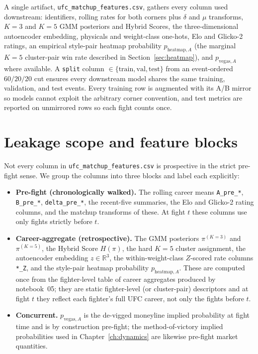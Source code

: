 \documentclass[12pt,oneside]{report}
\begin{document}
A single artifact, \texttt{ufc\_matchup\_features.csv}, gathers every
column used downstream: identifiers, rolling rates for both corners
plus $\delta$ and $\mu$ transforms, \(K = 3\) and \(K = 5\) GMM
posteriors and Hybrid Scores, the three-dimensional autoencoder
embedding, physicals and weight-class one-hots, Elo and Glicko-2
ratings, an empirical style-pair heatmap probability
\(p_{\mathrm{heatmap},A}\) (the marginal \(K = 5\) cluster-pair win rate
described in Section~\ref{sec:heatmap}), and \(p_{\mathrm{vegas},A}\)
where available.  A \texttt{split} column $\in \{\text{train},
\text{val}, \text{test}\}$ from an event-ordered $60/20/20$ cut
ensures every downstream model shares the same training, validation,
and test events.  Every training row is augmented with its A/B
mirror so models cannot exploit the arbitrary corner convention, and
test metrics are reported on unmirrored rows so each fight counts
once.

\section{Leakage scope and feature blocks}\label{sec:leakage-scope}

Not every column in \texttt{ufc\_matchup\_features.csv} is
prospective in the strict pre-fight sense.  We group the columns
into three blocks and label each explicitly:

\begin{itemize}
\item \textbf{Pre-fight (chronologically walked).}  The rolling
career means \texttt{A\_pre\_*}, \texttt{B\_pre\_*},
\texttt{delta\_pre\_*}, the recent-five summaries, the Elo and
Glicko-2 rating columns, and the matchup transforms of these.  At
fight $t$ these columns use only fights strictly before $t$.

\item \textbf{Career-aggregate (retrospective).}  The GMM posteriors
\(\pi^{(K = 3)}\) and \(\pi^{(K = 5)}\), the Hybrid Score \(H(\pi)\), the
hard \(K = 5\) cluster assignment, the autoencoder embedding \(z\in \mathbb{R}^3\), the within-weight-class $Z$-scored rate columns
\texttt{*\_Z}, and the style-pair heatmap probability
\(p_{\mathrm{heatmap},A}\).  These are computed once from the
fighter-level table of career aggregates produced by notebook~05;
they are static fighter-level (or cluster-pair) descriptors and at
fight $t$ they reflect each fighter's full UFC career, not only the
fights before $t$.

\item \textbf{Concurrent.}  \(p_{\mathrm{vegas},A}\) is the de-vigged
moneyline implied probability at fight time and is by construction
pre-fight; the method-of-victory implied probabilities used in
Chapter~\ref{ch:dynamics} are likewise pre-fight market quantities.
\end{itemize}
\end{document}
